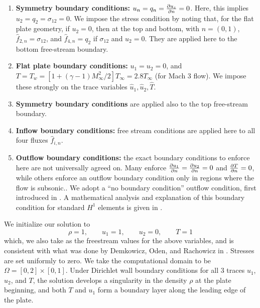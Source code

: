 \begin{enumerate}
\item \textbf{Symmetry boundary conditions:} $u_n = q_n = \pd{u_s}{n} = 0$. Here, this implies $u_2 = q_2 = \sigma_{12} = 0$. We impose the stress condition by noting that, for the flat plate geometry, if $u_2 = 0$, then at the top and bottom, with $n = (0,1)$, $\widehat{f}_{2,n} = \sigma_{12}$, and $\widehat{f}_{4,n} = q_2$ if $\sigma_{12}$ and $u_2 = 0$. They are applied here to the bottom free-stream boundary.
\item \textbf{Flat plate boundary conditions:} $u_1 = u_2 = 0$, and $T = T_w = \left[1+(\gamma-1)M_\infty^2/2\right] T_\infty = 2.8T_\infty$ (for Mach 3 flow). We impose these strongly on the trace variables $\widehat{u}_1, \widehat{u}_2, \widehat{T}$. 
\item \textbf{Symmetry boundary conditions} are applied also to the top free-stream boundary.
\item \textbf{Inflow boundary conditions:} free stream conditions are applied here to all four fluxes $\widehat{f}_{i,n}$.
\item \textbf{Outflow boundary conditions:} the exact boundary conditions to enforce here are not universally agreed on.  Many enforce $\pd{u_1}{n}=\pd{u_2}{n}=0$ and $\pd{T}{n} = 0$, while others enforce an outflow boundary condition only in regions where the flow is subsonic.\cite{Demkowicz:1990:NFE:112271.112276}.  We adopt a ``no boundary condition'' outflow condition, first introduced in \cite{FLD:FLD1650140506}. A mathematical analysis and explanation of this boundary condition for standard $H^1$ elements is given in \cite{FLD:FLD505}. 
\end{enumerate}

We initialize our solution to
\[
\rho = 1,\qquad u_1= 1,\qquad u_2 = 0, \qquad T = 1%
\]
which, we also take as the freestream values for the above variables, and is consistent with what was done by Demkowicz, Oden, and Rachowicz in \cite{Demkowicz1990275}. Stresses are set uniformly to zero.  We take the computational domain to be $\Omega = [0,2]\times[0,1]$. Under Dirichlet wall boundary conditions for all 3 traces $u_1$, $u_2$, and $T$, the solution develops a singularity in the density $\rho$ at the plate beginning, and both $T$ and $u_1$ form a boundary layer along the leading edge of the plate.  

